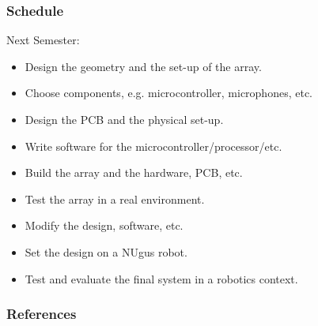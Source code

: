 \documentclass{beamer}
\begin{document}
\begin{frame}
\frametitle{Schedule}

Next Semester:
\begin{itemize}
	\item Design the geometry and the set-up of the array.
	\item Choose components, e.g. microcontroller, microphones, etc.
	\item Design the PCB and the physical set-up.
	\item Write software for the microcontroller/processor/etc.
	\item Build the array and the hardware, PCB, etc.
	\item Test the array in a real environment.
	\item Modify the design, software, etc.
	\item Set the design on a NUgus robot.
	\item Test and evaluate the final system in a robotics context.
\end{itemize}

\end{frame}

\begin{frame}
\frametitle{References}
\tiny



\end{frame}
\end{document}

